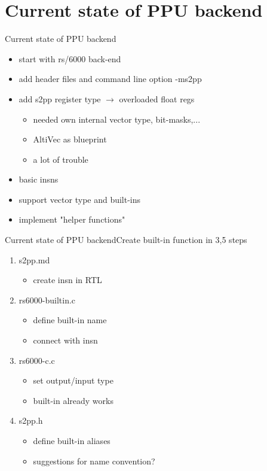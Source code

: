 \documentclass[10pt]{beamer}
\begin{document}
\section{Current state of PPU backend}
\begin{frame}{Current state of PPU backend}
	\begin{itemize}
		\item start with rs/6000 back-end
		\item add header files and command line option -ms2pp
		\item add s2pp register type $\rightarrow$ overloaded float regs
			\begin{itemize}
				\item needed own internal vector type, bit-masks,...
				\item AltiVec as blueprint
				\item a lot of trouble
			\end{itemize}
		\item basic insns
		\item support vector type and built-ins
		\item implement "helper functions"
	\end{itemize}
\end{frame}

\begin{frame}{Current state of PPU backend}{Create built-in function in 3,5 steps}
	\begin{enumerate}
		\item s2pp.md
		\begin{itemize}
			\item create insn in RTL
		\end{itemize}
		\item rs6000-builtin.c
		\begin{itemize}
			\item define built-in name
			\item connect with insn
		\end{itemize}
		\item rs6000-c.c
		\begin{itemize}
			\item set output/input type
			\item built-in already works
		\end{itemize}
		\item s2pp.h
		\begin{itemize}
			\item define built-in aliases
			\item suggestions for name convention?
		\end{itemize}
	\end{enumerate}
\end{frame}
\end{document}
